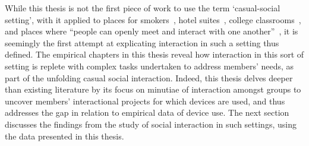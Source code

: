 \begin{revisedsubmission}
While this thesis is not the first piece of work to use the term `casual-social setting', with it applied to places for smokers~\citep{Schane2009}, hotel suites~\citep{Pigram1996}, college classrooms~\citep{Yamada1981}, and places where ``people can openly meet and interact with one another''~\citep[p. 42]{St.Lawrence1983}, it is seemingly the first attempt at explicating interaction in such a setting thus defined.
The empirical chapters in this thesis reveal how interaction in this sort of setting is replete with complex tasks undertaken to address members' needs, as part of the unfolding casual social interaction.
Indeed, this thesis delves deeper than existing literature by its focus on minutiae of interaction amongst groups to uncover members' interactional projects for which devices are used, and thus addresses the gap in relation to empirical data of device use.
%
The next section discusses the findings from the study of social interaction in such settings, using the data presented in this thesis.
\end{revisedsubmission}






